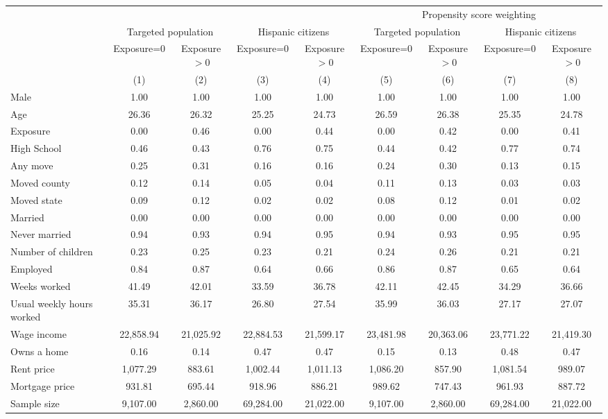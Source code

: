 \begin{tabular}{lcccccccc}
\toprule
\toprule
 & & & & & \multicolumn{4}{c}{Propensity score weighting} \\
 & \multicolumn{2}{c}{Targeted population} & \multicolumn{2}{c}{Hispanic citizens} & \multicolumn{2}{c}{Targeted population} & \multicolumn{2}{c}{Hispanic citizens}  \\
 & Exposure=0 & Exposure$>$0 & Exposure=0 & Exposure$>$0 & Exposure=0 & Exposure$>$0 & Exposure=0 & Exposure$>$0 \\
 & (1) & (2) & (3) & (4) & (5) & (6) & (7) & (8) \\
\midrule 
 Male  & 1.00 & 1.00 & 1.00 & 1.00 & 1.00 & 1.00 & 1.00 & 1.00\\
 Age  & 26.36 & 26.32 & 25.25 & 24.73 & 26.59 & 26.38 & 25.35 & 24.78\\
 Exposure  & 0.00 & 0.46 & 0.00 & 0.44 & 0.00 & 0.42 & 0.00 & 0.41\\
 High School  & 0.46 & 0.43 & 0.76 & 0.75 & 0.44 & 0.42 & 0.77 & 0.74\\
 Any move  & 0.25 & 0.31 & 0.16 & 0.16 & 0.24 & 0.30 & 0.13 & 0.15\\
 Moved county  & 0.12 & 0.14 & 0.05 & 0.04 & 0.11 & 0.13 & 0.03 & 0.03\\
 Moved state  & 0.09 & 0.12 & 0.02 & 0.02 & 0.08 & 0.12 & 0.01 & 0.02\\
 Married  & 0.00 & 0.00 & 0.00 & 0.00 & 0.00 & 0.00 & 0.00 & 0.00\\
 Never married  & 0.94 & 0.93 & 0.94 & 0.95 & 0.94 & 0.93 & 0.95 & 0.95\\
 Number of children  & 0.23 & 0.25 & 0.23 & 0.21 & 0.24 & 0.26 & 0.21 & 0.21\\
 Employed  & 0.84 & 0.87 & 0.64 & 0.66 & 0.86 & 0.87 & 0.65 & 0.64\\
 Weeks worked  & 41.49 & 42.01 & 33.59 & 36.78 & 42.11 & 42.45 & 34.29 & 36.66\\
 Usual weekly hours worked  & 35.31 & 36.17 & 26.80 & 27.54 & 35.99 & 36.03 & 27.17 & 27.07\\
 Wage income  & 22,858.94 & 21,025.92 & 22,884.53 & 21,599.17 & 23,481.98 & 20,363.06 & 23,771.22 & 21,419.30\\
 Owns a home  & 0.16 & 0.14 & 0.47 & 0.47 & 0.15 & 0.13 & 0.48 & 0.47\\
 Rent price  & 1,077.29 & 883.61 & 1,002.44 & 1,011.13 & 1,086.20 & 857.90 & 1,081.54 & 989.07\\
 Mortgage price  & 931.81 & 695.44 & 918.96 & 886.21 & 989.62 & 747.43 & 961.93 & 887.72\\
 Sample size  & 9,107.00 & 2,860.00 & 69,284.00 & 21,022.00 & 9,107.00 & 2,860.00 & 69,284.00 & 21,022.00\\
\bottomrule
\bottomrule
\end{tabular}